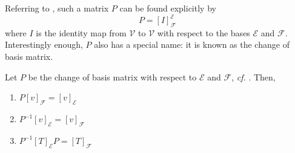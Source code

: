\begin{rem}\label{rem-change-of-basis-matrix}
	Referring to , such a
	matrix $P$ can be found explicitly by
	\begin{equation}\label{eq-change-of-basis-matrix}
		P=[I]_\mathcal{F}^\mathcal{E}
	\end{equation}
	where $I$ is the identity map from $\mathcal{V}$ to $\mathcal{V}$ with respect to
	the bases $\mathcal{E}$ and $\mathcal{F}$. Interestingly enough, $P$ also has a
	special name: it is known as the change of basis matrix.
\end{rem}

\begin{thm}\label{thm-change-of-basis-matrix-properties}
	Let $P$ be the change of basis matrix with respect to $\mathcal{E}$ and
	$\mathcal{F}$, \textit{cf.} . Then,
	\begin{enumerate}
		\item $P[v]_\mathcal{F}=[v]_\mathcal{E}$
		\item $P^{-1}[v]_\mathcal{E}=[v]_\mathcal{F}$
		\item $P^{-1}[T]_\mathcal{E}P=[T]_\mathcal{F}$
	\end{enumerate}
\end{thm}


